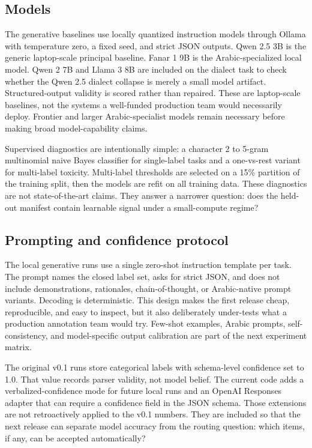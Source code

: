 \documentclass[10pt,twocolumn]{article}
\begin{document}
\subsection{Models}
The generative baselines use locally quantized instruction models through
Ollama with temperature zero, a fixed seed, and strict JSON outputs. Qwen 2.5
3B is the generic laptop-scale principal baseline. Fanar 1 9B is the
Arabic-specialized local model. Qwen 2 7B and Llama 3 8B are included on the
dialect task to check whether the Qwen 2.5 dialect collapse is merely a small
model artifact. Structured-output validity is scored rather than repaired.
These are laptop-scale baselines, not the systems a well-funded production
team would necessarily deploy. Frontier and larger Arabic-specialist models
remain necessary before making broad model-capability claims.

Supervised diagnostics are intentionally simple: a character 2 to 5-gram
multinomial naive Bayes classifier for single-label tasks and a one-vs-rest
variant for multi-label toxicity. Multi-label thresholds are selected on a
15\% partition of the training split, then the models are refit on all
training data. These diagnostics are not state-of-the-art claims. They answer
a narrower question: does the held-out manifest contain learnable signal under
a small-compute regime?

\subsection{Prompting and confidence protocol}
The local generative runs use a single zero-shot instruction template per task.
The prompt names the closed label set, asks for strict JSON, and does not
include demonstrations, rationales, chain-of-thought, or Arabic-native prompt
variants. Decoding is deterministic. This design makes the first release
cheap, reproducible, and easy to inspect, but it also deliberately under-tests
what a production annotation team would try. Few-shot examples, Arabic prompts,
self-consistency, and model-specific output calibration are part of the next
experiment matrix.

The original v0.1 runs store categorical labels with schema-level confidence
set to 1.0. That value records parser validity, not model belief. The current
code adds a verbalized-confidence mode for future local runs and an OpenAI
Responses adapter that can require a confidence field in the JSON schema. Those
extensions are not retroactively applied to the v0.1 numbers. They are included
so that the next release can separate model accuracy from the routing question:
which items, if any, can be accepted automatically?
\end{document}
